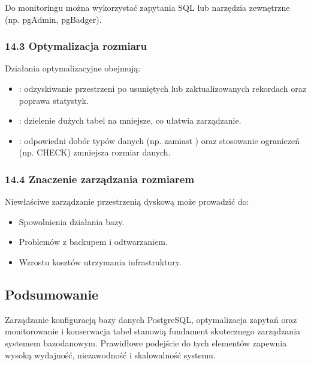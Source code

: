 \documentclass[letterpaper,10pt,polish]{sphinxmanual}
\begin{document}
\sphinxAtStartPar
Do monitoringu można wykorzystać zapytania SQL lub narzędzia zewnętrzne (np. pgAdmin, pgBadger).


\subsubsection{14.3 Optymalizacja rozmiaru}
\label{\detokenize{rozdzial2/Konfiguracja_baz_danych/Konfiguracja_baz_danych:optymalizacja-rozmiaru}}
\sphinxAtStartPar
Działania optymalizacyjne obejmują:
\begin{itemize}
\item {} 
\sphinxAtStartPar
{}: odzyskiwanie przestrzeni po usuniętych lub zaktualizowanych rekordach oraz poprawa statystyk.

\item {} 
\sphinxAtStartPar
{}: dzielenie dużych tabel na mniejsze, co ułatwia zarządzanie.

\item {} 
\sphinxAtStartPar
{}: odpowiedni dobór typów danych (np.  zamiast ) oraz stosowanie ograniczeń (np. CHECK) zmniejsza rozmiar danych.

\end{itemize}


\subsubsection{14.4 Znaczenie zarządzania rozmiarem}
\label{\detokenize{rozdzial2/Konfiguracja_baz_danych/Konfiguracja_baz_danych:znaczenie-zarzadzania-rozmiarem}}
\sphinxAtStartPar
Niewłaściwe zarządzanie przestrzenią dyskową może prowadzić do:
\begin{itemize}
\item {} 
\sphinxAtStartPar
Spowolnienia działania bazy.

\item {} 
\sphinxAtStartPar
Problemów z backupem i odtwarzaniem.

\item {} 
\sphinxAtStartPar
Wzrostu kosztów utrzymania infrastruktury.

\end{itemize}


\subsection{Podsumowanie}
\label{\detokenize{rozdzial2/Konfiguracja_baz_danych/Konfiguracja_baz_danych:podsumowanie}}
\sphinxAtStartPar
Zarządzanie konfiguracją bazy danych PostgreSQL, optymalizacja zapytań oraz monitorowanie i konserwacja tabel stanowią fundament skutecznego zarządzania systemem bazodanowym. Prawidłowe podejście do tych elementów zapewnia wysoką wydajność, niezawodność i skalowalność systemu.
\end{document}
